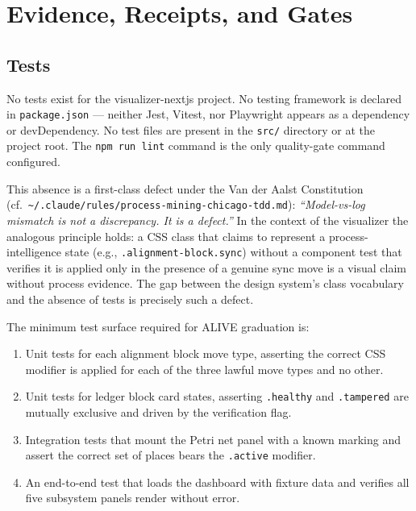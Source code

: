 
\section{Evidence, Receipts, and Gates}
\label{sec:experiments-visualizer-nextjs-evidence}

\subsection{Tests}
\label{sec:experiments-visualizer-nextjs-evidence-tests}

No tests exist for the visualizer-nextjs project. No testing framework is declared in
\texttt{package.json} --- neither Jest, Vitest, nor Playwright appears as a dependency or
devDependency. No test files are present in the \texttt{src/} directory or at the project
root. The \texttt{npm run lint} command is the only quality-gate command configured.

This absence is a first-class defect under the Van der Aalst Constitution (cf.\
\texttt{{\textasciitilde}/.claude/rules/process-mining-chicago-tdd.md}): \emph{``Model-vs-log
mismatch is not a discrepancy. It is a defect.''} In the context of the visualizer the
analogous principle holds: a CSS class that claims to represent a process-intelligence
state (e.g., \texttt{.alignment-block.sync}) without a component test that verifies it is
applied only in the presence of a genuine sync move is a visual claim without process
evidence. The gap between the design system's class vocabulary and the absence of tests
is precisely such a defect.

The minimum test surface required for ALIVE graduation is:
\begin{enumerate}
  \item Unit tests for each alignment block move type, asserting the correct CSS modifier
        is applied for each of the three lawful move types and no other.
  \item Unit tests for ledger block card states, asserting \texttt{.healthy} and
        \texttt{.tampered} are mutually exclusive and driven by the verification flag.
  \item Integration tests that mount the Petri net panel with a known marking and assert
        the correct set of places bears the \texttt{.active} modifier.
  \item An end-to-end test that loads the dashboard with fixture data and verifies all
        five subsystem panels render without error.
\end{enumerate}


